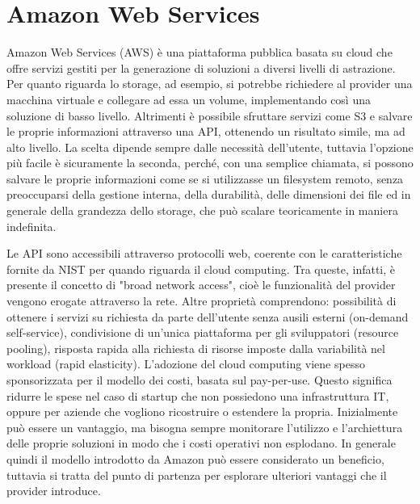 \section{Amazon Web Services}
Amazon Web Services (AWS) è una piattaforma pubblica basata su cloud che offre servizi gestiti per la generazione di soluzioni a diversi livelli di astrazione. Per quanto riguarda lo storage, ad esempio, si potrebbe richiedere al provider una macchina virtuale e collegare ad essa un volume, implementando così una soluzione di basso livello. Altrimenti è possibile sfruttare servizi come S3 e salvare le proprie informazioni attraverso una API, ottenendo un risultato simile, ma ad alto livello. La scelta dipende sempre dalle necessità dell'utente, tuttavia l'opzione più facile è sicuramente la seconda, perché, con una semplice chiamata, si possono salvare le proprie informazioni come se si utilizzasse un filesystem remoto, senza preoccuparsi della gestione interna, della durabilità, delle dimensioni dei file ed in generale della grandezza dello storage, che può scalare teoricamente in maniera indefinita. %

Le API sono accessibili attraverso protocolli web, coerente con le caratteristiche fornite da NIST per quando riguarda il cloud computing. Tra queste, infatti, è presente il concetto di "broad network access", cioè le funzionalità del provider vengono erogate attraverso la rete. Altre proprietà comprendono: possibilità di ottenere i servizi su richiesta da parte dell'utente senza ausili esterni (on-demand self-service), condivisione di un'unica piattaforma per gli sviluppatori (resource pooling), risposta rapida alla richiesta di risorse imposte dalla variabilità nel workload (rapid elasticity).  
L'adozione del cloud computing viene spesso sponsorizzata per il modello dei costi, basata sul pay-per-use. Questo significa ridurre le spese nel caso di startup che non possiedono una infrastruttura IT, oppure per aziende che vogliono ricostruire o estendere la propria. Inizialmente può essere un vantaggio, ma bisogna sempre monitorare l'utilizzo e l'archiettura delle proprie soluzioni in modo che i costi operativi non esplodano. In generale quindi il modello introdotto da Amazon può essere considerato un beneficio, tuttavia si tratta del punto di partenza per esplorare ulteriori vantaggi che il provider introduce. 

